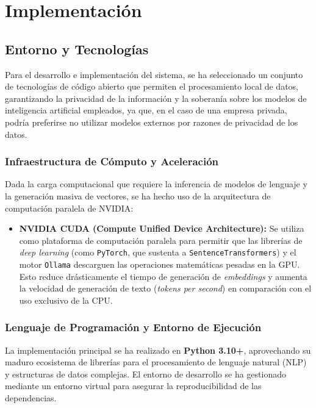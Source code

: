 \chapter{Implementación}\label{cap6}

\newpage
\section{Entorno y Tecnologías}

Para el desarrollo e implementación del sistema, se ha seleccionado un conjunto de tecnologías de código abierto que permiten el procesamiento local de datos, garantizando la privacidad de la información y la soberanía sobre los modelos de inteligencia artificial empleados, ya que, en el caso de una empresa privada, podría preferirse no utilizar modelos externos por razones de privacidad de los datos.

\subsection{Infraestructura de Cómputo y Aceleración}
Dada la carga computacional que requiere la inferencia de modelos de lenguaje y la generación masiva de vectores, se ha hecho uso de la arquitectura de computación paralela de NVIDIA:

\begin{itemize}
    \item \textbf{NVIDIA CUDA (Compute Unified Device Architecture):} Se utiliza como plataforma de computación paralela para permitir que las librerías de \textit{deep learning} (como \texttt{PyTorch}, que sustenta a \texttt{SentenceTransformers}) y el motor \texttt{Ollama} descarguen las operaciones matemáticas pesadas en la GPU. Esto reduce drásticamente el tiempo de generación de \textit{embeddings} y aumenta la velocidad de generación de texto (\textit{tokens per second}) en comparación con el uso exclusivo de la CPU.
\end{itemize}

\subsection{Lenguaje de Programación y Entorno de Ejecución}
La implementación principal se ha realizado en \textbf{Python 3.10+}, aprovechando su maduro ecosistema de librerías para el procesamiento de lenguaje natural (NLP) y estructuras de datos complejas. El entorno de desarrollo se ha gestionado mediante un entorno virtual para asegurar la reproducibilidad de las dependencias.


